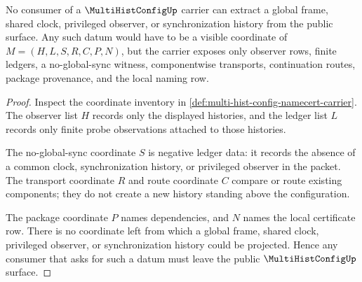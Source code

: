 \begin{theorem}
\label{thm:multi-hist-config-no-global-sync-ledger}
No consumer of a $\MultiHistConfigUp$ carrier can extract a global frame, shared clock, privileged observer, or synchronization history from the public surface. Any such datum would have to be a visible coordinate of $M=(H,L,S,R,C,P,N)$, but the carrier exposes only observer rows, finite ledgers, a no-global-sync witness, componentwise transports, continuation routes, package provenance, and the local naming row.
\end{theorem}
\begin{proof}
Inspect the coordinate inventory in \autoref{def:multi-hist-config-namecert-carrier}. The observer list $H$ records only the displayed histories, and the ledger list $L$ records only finite probe observations attached to those histories.

The no-global-sync coordinate $S$ is negative ledger data: it records the absence of a common clock, synchronization history, or privileged observer in the packet. The transport coordinate $R$ and route coordinate $C$ compare or route existing components; they do not create a new history standing above the configuration.

The package coordinate $P$ names dependencies, and $N$ names the local certificate row. There is no coordinate left from which a global frame, shared clock, privileged observer, or synchronization history could be projected. Hence any consumer that asks for such a datum must leave the public $\MultiHistConfigUp$ surface.
\end{proof}

